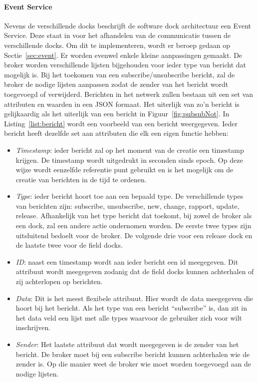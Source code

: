 \paragraph{Event Service}
Nevens de verschillende docks beschrijft de software dock architectuur een Event Service.
Deze staat in voor het afhandelen van de communicatie tussen de verschillende docks.
Om dit te implementeren, wordt er beroep gedaan op Sectie~\vref{sec:event}.
Er worden evenwel enkele kleine aanpassingen gemaakt.
De broker worden verschillende lijsten bijgehouden voor ieder type van bericht dat mogelijk is.
Bij het toekomen van een subscribe/unsubscribe bericht, zal de broker de nodige lijsten aanpassen zodat de zender van het bericht wordt toegevoegd of verwijderd.
Berichten in het netwerk zullen bestaan uit een set van attributen en waarden in een JSON formaat.
Het uiterlijk van zo'n bericht is gelijkaardig als het uiterlijk van een bericht in Figuur~\vref{fig:pubsubNot}.
In Listing~\vref{list:bericht} wordt een voorbeeld van een bericht weergegeven.
Ieder bericht heeft dezelfde set aan attributen die elk een eigen functie hebben:
\begin{itemize}
\item \emph{Timestamp}: ieder bericht zal op het moment van de creatie een timestamp krijgen.
De timestamp wordt uitgedrukt in seconden sinds epoch.
Op deze wijze wordt eenzelfde referentie punt gebruikt en is het mogelijk om de creatie van berichten in de tijd te ordenen.
\item \emph{Type}: ieder bericht hoort toe aan een bepaald type.
De verschillende types van berichten zijn: subscribe, unsubscribe, new, change, rapport, update, release.
Afhankelijk van het type bericht dat toekomt, bij zowel de broker als een dock, zal een andere actie ondernomen worden.
De eerste twee types zijn uitsluitend bedoelt voor de broker.
De volgende drie voor een release dock en de laatste twee voor de field docks.
\item \emph{ID}: naast een timestamp wordt aan ieder bericht een id meegegeven. 
Dit attribuut wordt meegegeven zodanig dat de field docks kunnen achterhalen of zij achterlopen op berichten.
\item \emph{Data}: Dit is het meest flexibele attribuut. 
Hier wordt de data meegegeven die hoort bij het bericht.
Als het type van een bericht ``subscribe'' is, dan zit in het data veld een lijst met alle types waarvoor de gebruiker zich voor wilt inschrijven.
\item \emph{Sender}: Het laatste attribuut dat wordt meegegeven is de zender van het bericht.
De broker moet bij een subscribe bericht kunnen achterhalen wie de zender is.
Op die manier weet de broker wie moet worden toegevoegd aan de nodige lijsten.
\end{itemize}

